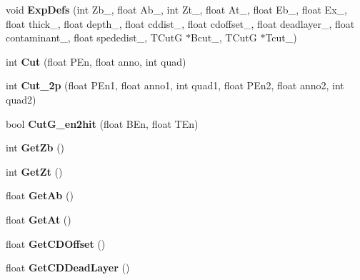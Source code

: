 \begin{DoxyCompactItemize}
\item 
\mbox{\label{classdoppler_ac628277148db1641251745f86ba3dc52}} 
void {\bfseries Exp\+Defs} (int Zb\+\_\+, float Ab\+\_\+, int Zt\+\_\+, float At\+\_\+, float Eb\+\_\+, float Ex\+\_\+, float thick\+\_\+, float depth\+\_\+, float cddist\+\_\+, float cdoffset\+\_\+, float deadlayer\+\_\+, float contaminant\+\_\+, float spededist\+\_\+, T\+CutG $\ast$Bcut\+\_\+, T\+CutG $\ast$Tcut\+\_\+)
\item 
\mbox{\label{classdoppler_aa3debb227d73f7cdea5b02e4c202cb19}} 
int {\bfseries Cut} (float P\+En, float anno, int quad)
\item 
\mbox{\label{classdoppler_a52f116733da78465469a75ced66915a8}} 
int {\bfseries Cut\+\_\+2p} (float P\+En1, float anno1, int quad1, float P\+En2, float anno2, int quad2)
\item 
\mbox{\label{classdoppler_a56df9f9384f469385458193754c743c9}} 
bool {\bfseries Cut\+G\+\_\+en2hit} (float B\+En, float T\+En)
\item 
\mbox{\label{classdoppler_a29e9a1565d90df9f5d9deef05cdbf53c}} 
int {\bfseries Get\+Zb} ()
\item 
\mbox{\label{classdoppler_ac0587ca2b963edec86d17dd6dac024ce}} 
int {\bfseries Get\+Zt} ()
\item 
\mbox{\label{classdoppler_ac3cde63421ff794992231027245ceced}} 
float {\bfseries Get\+Ab} ()
\item 
\mbox{\label{classdoppler_a72bb0dc1707c0f2bf4b978caf06f2cf1}} 
float {\bfseries Get\+At} ()
\item 
\mbox{\label{classdoppler_ac7725720fab82af5a5a6f02041bc9483}} 
float {\bfseries Get\+C\+D\+Offset} ()
\item 
\mbox{\label{classdoppler_a2c1aef6db4ad3fc0c98e91d995992706}} 
float {\bfseries Get\+C\+D\+Dead\+Layer} ()
\item 
\mbox{\label{classdoppler_ae45abdba9f375009cdeba5ac81d7b32c}} 

\end{DoxyCompactItemize}
